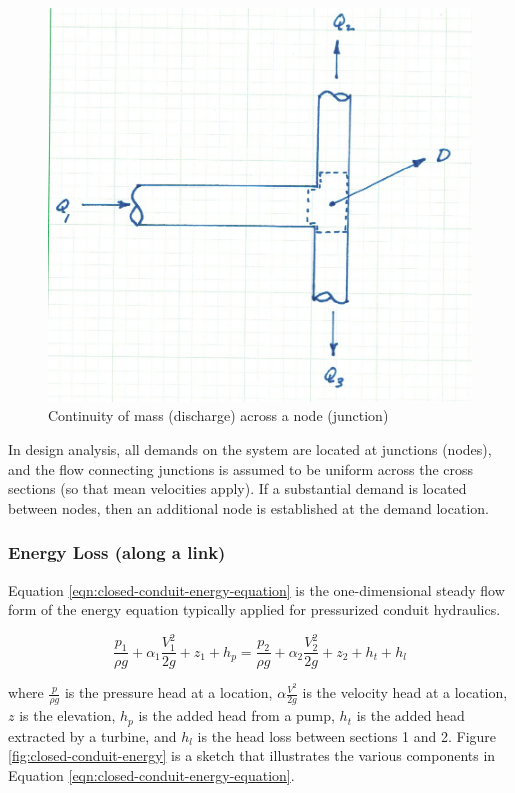 \begin{figure}[h!] %
   \centering
   \includegraphics[width=5in]{./8-PipeNetworkHydraulics/continuity-at-node.jpg} 
   \caption{Continuity of mass (discharge) across a node (junction)}
   \label{fig:continuity-at-node}
\end{figure}

In design analysis, all demands on the system are located at junctions (nodes), and the flow connecting junctions is assumed to be uniform across the cross sections (so that mean velocities apply). 
If a substantial demand is located between nodes, then an additional node is established at the demand location. 

\subsubsection{Energy Loss (along a link)}
Equation \ref{eqn:closed-conduit-energy-equation} is the one-dimensional steady flow form of the energy equation typically applied for pressurized conduit hydraulics.
 
\begin{equation}
\frac{p_1}{\rho g}+\alpha_1 \frac{V_1^2}{2g} + z_1 + h_p =
\frac{p_2}{\rho g}+\alpha_2 \frac{V_2^2}{2g} + z_2 + h_t + h_l
\label{eqn:closed-conduit-energy-equation}
\end{equation}

where $\frac{p}{\rho g}$ is the pressure head at a location, $\alpha \frac{V^2}{2g}$ is the velocity head at a location, $z$ is the elevation, $h_p$ is the added head from a pump, $h_t$ is the added head extracted by a turbine, and $h_l$ is the head loss between sections 1 and 2.   Figure \ref{fig:closed-conduit-energy} is a sketch that illustrates the various components in Equation \ref{eqn:closed-conduit-energy-equation}.

